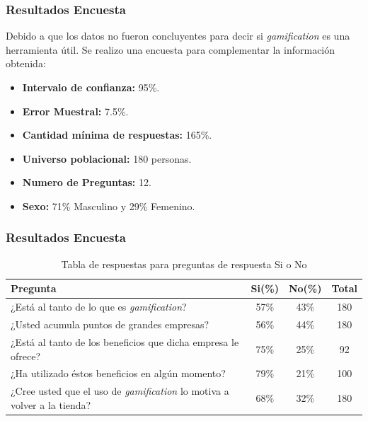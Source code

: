 \documentclass[10pt, compress]{beamer}
\begin{document}
\begin{frame}
 \frametitle{Resultados Encuesta}

Debido a que los datos no fueron concluyentes para decir si \emph{gamification} es una herramienta útil. 
Se realizo una encuesta para complementar la información obtenida:

\begin{itemize}
    \item \textbf{Intervalo de confianza:} 95\%.
    \item \textbf{Error Muestral:} 7.5\%.
    \item \textbf{Cantidad mínima de respuestas:} 165\%.
    \item \textbf{Universo poblacional:} 180 personas.
    \item \textbf{Numero de Preguntas:} 12.
    \item \textbf{Sexo:} 71\% Masculino y 29\% Femenino.
\end{itemize}

\end{frame}

\begin{frame}
 \frametitle{Resultados Encuesta}

\begin{table}[h]
\centering
\footnotesize
\begin{tabular}{| p{6cm} | c | c | c |}
\hline
                          {\bf Pregunta}
                        & {\bf Si(\%)}
                        & {\bf No(\%)}
                        & {\bf Total} \\ \hline
¿Está al tanto de lo que es \emph{gamification}?&57\%&43\%&180 \\ \hline
¿Usted acumula puntos de grandes empresas?&56\%&44\%&180 \\ \hline
¿Está al tanto de los beneficios que dicha empresa le ofrece?&75\%&25\%&92 \\ \hline
¿Ha utilizado éstos beneficios en algún momento?&79\%&21\%&100 \\ \hline
¿Cree usted que el uso de \emph{gamification} lo motiva a volver a la tienda?&68\%&32\%&180 \\ \hline
\end{tabular}
\caption{Tabla de respuestas para preguntas de respuesta Si o No}
\end{table}
\end{frame}
\end{document}
